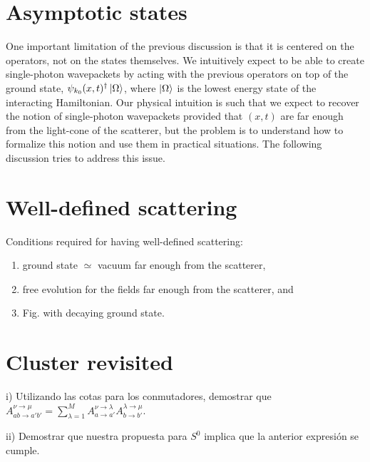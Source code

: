 \documentclass[notitlepage, prx, preprint, amsmath,superscriptaddress,amssymb]{revtex4-1}
\begin{document}
\section{Asymptotic states}

One important limitation of the previous discussion is that it is centered on the operators, not on the states themselves. We intuitively expect to be able to create single-photon wavepackets by acting with the previous operators on top of the ground state, $\psi_{k_0}(x,t)^\dagger\ket{\Omega}$, where $\ket{\Omega}$ is the lowest energy state of the interacting Hamiltonian. Our physical intuition is such that we expect to recover the notion of single-photon wavepackets provided that $(x,t)$ are far enough from the light-cone of the scatterer, but the problem is to understand how to formalize this notion and use them in practical situations. The following discussion tries to address this issue.


\section{Well-defined scattering}

{\color{blue}Conditions required for having well-defined scattering:

\begin{enumerate}
\item ground state $\simeq$ vacuum far enough from the scatterer,
\item free evolution for the fields far enough from the scatterer, and
\item Fig. with decaying ground state.
\end{enumerate}
}

\section{Cluster revisited}

{\color{red}
i) Utilizando las cotas para los conmutadores, demostrar que $A_{ab\to a'b'}^{\nu\to\mu} =  \sum_{\lambda=1}^M A_{a\to a'}^{\nu\to\lambda} A_{b\to b'}^{\lambda\to\mu}$.

ii) Demostrar que nuestra propuesta para $S^0$ implica que la anterior expresión se cumple.

}
\end{document}
